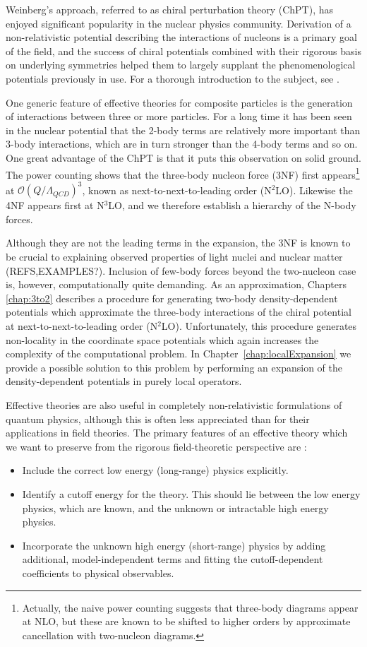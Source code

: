 Weinberg's approach, referred to as chiral perturbation theory (ChPT), has enjoyed significant popularity in the nuclear physics community. Derivation of a non-relativistic potential describing the interactions of nucleons is a primary goal of the field, and the success of chiral potentials combined with their rigorous basis on underlying symmetries helped them to largely supplant the phenomenological potentials previously in use. For a thorough introduction to the subject, see \cite{Machleidt20111}.

One generic feature of effective theories for composite particles is the generation of interactions between three or more particles. For a long time it has been seen in the nuclear potential that the 2-body terms are relatively more important than 3-body interactions, which are in turn stronger than the 4-body terms and so on. One great advantage of the ChPT is that it puts this observation on solid ground. The power counting shows that the three-body nucleon force (3NF) first appears\footnote{Actually, the naive power counting suggests that three-body diagrams appear at NLO, but these are known to be shifted to higher orders by approximate cancellation with two-nucleon diagrams\cite{PhysRevC.49.2932}.} at $\mathcal{O}(Q/\Lambda_{QCD})^3$, known as next-to-next-to-leading order (N$^2$LO). Likewise the 4NF appears first at N$^3$LO, and we therefore establish a hierarchy of the N-body forces. 

Although they are not the leading terms in the expansion, the 3NF is known to be crucial to explaining observed properties of light nuclei and nuclear matter (REFS,EXAMPLES?). Inclusion of few-body forces beyond the two-nucleon case is, however, computationally quite demanding. As an approximation, 
Chapters \ref{chap:3to2} describes a procedure for generating two-body density-dependent potentials which approximate the three-body interactions of the chiral potential at next-to-next-to-leading order (N$^2$LO). Unfortunately, this procedure generates non-locality in the coordinate space potentials which again increases the complexity of the computational problem. In Chapter~\ref{chap:localExpansion} we provide a possible solution to this problem by performing an expansion of the density-dependent potentials in purely local operators.

Effective theories are also useful in completely non-relativistic formulations of quantum physics, although this is often less appreciated than for their applications in field theories. The primary features of an effective theory which we want to preserve from the rigorous field-theoretic perspective are \cite{Lepage:1997}:
\begin{itemize}
\item Include the correct low energy (long-range) physics explicitly. 
\item Identify a cutoff energy for the theory. This should lie between the low energy physics, which are known, and the unknown or intractable high energy physics. 
\item Incorporate the unknown high energy (short-range) physics by adding additional, model-independent terms and fitting the cutoff-dependent coefficients to physical observables.
\end{itemize}

